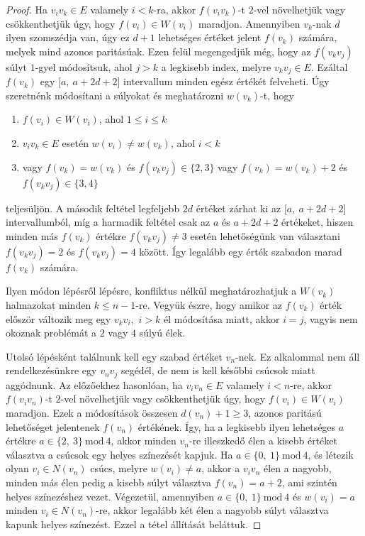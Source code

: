\documentclass[12pt, a4paper]{report}
\theoremstyle{remark}
\theoremstyle{definition}
\begin{document}
\begin{proof}
Ha $v_i v_k \in E$ valamely $i < k$-ra, akkor $f(v_i v_k)$-t $2$-vel növelhetjük vagy csökkenthetjük úgy, hogy $f(v_i) \in W(v_i)$ maradjon. Amennyiben $v_k$-nak $d$ ilyen szomszédja van, úgy ez $d + 1$ lehetséges értéket jelent $f(v_k)$ számára, melyek mind azonos paritásúak. Ezen felül megengedjük még, hogy az $f(v_k v_j)$ súlyt $1$-gyel módosítsuk, ahol $j > k$ a legkisebb index, melyre $v_k v_j \in E$. Ezáltal $f(v_k)$ egy $\lbrack a,\ a + 2d + 2 \rbrack$ intervallum minden egész értékét felveheti. Úgy szeretnénk módosítani a súlyokat és meghatározni $w(v_k)$-t, hogy
\begin{enumerate}
\item $f(v_i) \in W(v_i)$, ahol $1 \leq i \leq k$
\item $v_i v_k \in E$ esetén $w(v_i) \neq w(v_k)$, ahol $i < k$
\item vagy $f(v_k) = w(v_k)$ és $f(v_k v_j) \in \lbrace 2, 3 \rbrace$ vagy $f(v_k) = w(v_k) + 2$ és $f(v_k v_j) \in \lbrace 3, 4 \rbrace$
\end{enumerate}
teljesüljön. A második feltétel legfeljebb $2d$ értéket zárhat ki az $\lbrack a,\ a + 2d + 2 \rbrack$ intervallumból, míg a harmadik feltétel csak az $a$ és $a + 2d + 2$ értékeket, hiszen minden más $f(v_k)$ értékre $f(v_k v_j) \neq 3$ esetén lehetőségünk van választani $f(v_k v_j) = 2$ és $f(v_k v_j) = 4$ között. Így legalább egy érték szabadon marad $f(v_k)$ számára.

Ilyen módon lépésről lépésre, konfliktus nélkül meghatározhatjuk a $W(v_k)$ halmazokat minden $k \leq n - 1$-re. Vegyük észre, hogy amikor az $f(v_k)$ érték először változik meg egy $v_k v_i$,\ $i > k$ él módosítása miatt, akkor $i = j$, vagyis nem okoznak problémát a $2$ vagy $4$ súlyú élek.

Utolsó lépésként találnunk kell egy szabad értéket $v_n$-nek. Ez alkalommal nem áll rendelkezésünkre egy $v_n v_j$ segédél, de nem is kell későbbi csúcsok miatt aggódnunk. Az előzőekhez hasonlóan, ha $v_i v_n \in E$ valamely $i < n$-re, akkor $f(v_i v_n)$-t $2$-vel növelhetjük vagy csökkenthetjük úgy, hogy $f(v_i) \in W(v_i)$ maradjon. Ezek a módosítások összesen $d(v_n) +1 \geq 3$, azonos paritású lehetőséget jelentenek $f(v_n)$ értékének. Így, ha a legkisebb ilyen lehetséges $a$ értékre $a \in \lbrace 2,\ 3 \rbrace\ \mathrm{mod}\ 4$, akkor minden $v_n$-re illeszkedő élen a kisebb értéket választva a csúcsok egy helyes színezését kapjuk. Ha $a \in \lbrace 0,\ 1 \rbrace\ \mathrm{mod}\ 4$, és létezik olyan $v_i \in N(v_n)$ csúcs, melyre $w(v_i) \neq a$, akkor a $v_i v_n$ élen a nagyobb, minden más élen pedig a kisebb súlyt választva $f(v_n) = a + 2$, ami szintén helyes színezéshez vezet. Végezetül, amennyiben $a \in \lbrace 0,\ 1 \rbrace\ \mathrm{mod}\ 4$ és $w(v_i) = a$ minden $v_i \in N(v_n)$-re, akkor legalább két élen a nagyobb súlyt választva kapunk helyes színezést. Ezzel a tétel állítását beláttuk.
\end{proof}
\end{document}
